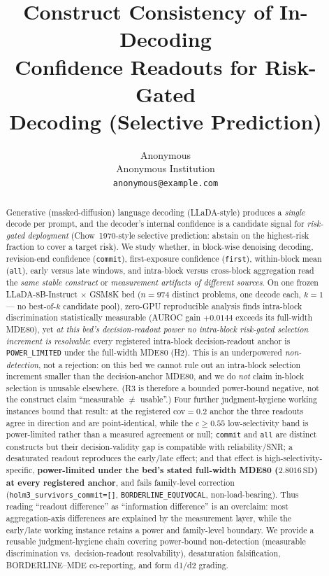 \documentclass{article}
\title{Construct Consistency of In-Decoding\\
Confidence Readouts for Risk-Gated\\
Decoding (Selective Prediction)}
\author{Anonymous\\
Anonymous Institution\\
\texttt{anonymous@example.com}
}
\begin{document}
\maketitle

\begin{abstract}
Generative (masked-diffusion) language decoding (LLaDA-style) produces a \emph{single}
decode per prompt, and the decoder's internal confidence is a candidate signal for
\emph{risk-gated deployment} (Chow~1970-style selective prediction: abstain on the
highest-risk fraction to cover a target risk). We study whether, in block-wise denoising
decoding, revision-end confidence
(\texttt{commit}), first-exposure confidence (\texttt{first}), within-block mean
(\texttt{all}), early versus late windows, and intra-block versus cross-block aggregation
read the \emph{same stable construct} or \emph{measurement artifacts of different sources}.
On one frozen LLaDA-8B-Instruct $\times$ GSM8K bed ($n{=}974$ distinct problems, one
decode each, $k{=}1$ --- no best-of-$k$ candidate pool), zero-GPU reproducible
analysis finds intra-block discrimination statistically measurable (AUROC gain $+0.0144$
exceeds its full-width MDE80), yet \emph{at this bed's decision-readout power no intra-block
risk-gated selection increment is resolvable}: every registered intra-block
decision-readout anchor is \texttt{POWER\_LIMITED} under the full-width MDE80
(H2). This is an underpowered \emph{non-detection}, not a rejection: on this bed we cannot
rule out an intra-block selection increment smaller than the decision-anchor MDE80, and we
do \emph{not} claim in-block selection is unusable elsewhere. (R3 is therefore a bounded
power-bound negative, not the construct claim ``measurable $\neq$ usable''.) Four further
judgment-hygiene working instances bound that result: at the registered cov$=0.2$
anchor the three readouts agree in direction and are point-identical, while the $c\ge0.55$
low-selectivity band is power-limited rather than a measured agreement or null;
\texttt{commit} and \texttt{all} are distinct constructs but
their decision-validity gap is compatible with reliability/SNR; a desaturated readout
reproduces the early/late effect; and that effect is high-selectivity-specific,
\textbf{power-limited under the bed's stated full-width MDE80 ($2.8016\,\mathrm{SD}$) at
every registered anchor}, and fails family-level correction
(\texttt{holm3\_survivors\_commit=[]}, \texttt{BORDERLINE\_EQUIVOCAL}, non-load-bearing).
Thus reading
``readout difference'' as ``information difference'' is an overclaim: most aggregation-axis
differences are explained by the measurement layer, while the early/late working instance
retains a power and family-level boundary. We provide a reusable
judgment-hygiene chain covering power-bound non-detection (measurable discrimination vs.\
decision-readout resolvability), desaturation falsification,
BORDERLINE--MDE co-reporting, and form d1/d2 grading.
\end{abstract}
\end{document}
